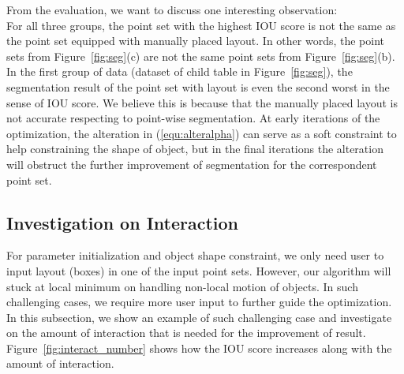 From the evaluation, we want to discuss one interesting observation:\\
%
For all three groups, the point set with the highest IOU score is not the same as the point set equipped with manually placed layout.
In other words, the point sets from Figure~\ref{fig:seg}(c) are not the same point sets from Figure~\ref{fig:seg}(b). 
In the first group of data (dataset of child table in Figure~\ref{fig:seg}), the segmentation result of the point set with layout is even the second worst in the sense of IOU score. 
We believe this is because that the manually placed layout is not accurate respecting to point-wise segmentation. 
At early iterations of the optimization, the alteration in (\ref{equ:alteralpha}) can serve as a soft constraint to help constraining the shape of object, but in the final iterations the alteration will obstruct the further improvement of segmentation for the correspondent point set. 

\subsection{Investigation on Interaction}
\label{subsec:interact}

For parameter initialization and object shape constraint, we only need user to input layout (boxes) in one of the input point sets. However, our algorithm will stuck at local minimum on handling non-local motion of objects. In such challenging cases, we require more user input to further guide the optimization. In this subsection, we show an example of such challenging case and investigate on the amount of interaction that is needed for the improvement of result. Figure~\ref{fig:interact_number} shows how the IOU score increases along with the amount of interaction.


 
